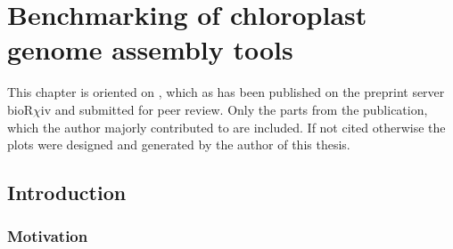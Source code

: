 \newcommand{\formatprogramnames}[1]{\texttt{#1}}
\newcommand{\ce}{\formatprogramnames{chloroExtractor}}
\newcommand{\oa}{\formatprogramnames{ORG.Asm}}
\newcommand{\fp}{\formatprogramnames{Fast-Plast}}
\newcommand{\ioga}{\formatprogramnames{IOGA}}
\newcommand{\np}{\formatprogramnames{NOVOPlasty}}
\newcommand{\go}{\formatprogramnames{GetOrganelle}}
\newcommand{\cassp}{\formatprogramnames{Chloroplast assembly protocol}}



\chapter{Benchmarking of chloroplast genome assembly tools } %

\label{Chapter1} %
This chapter is oriented on \cite{freudenthal2019landscape}, which as
has been published on the preprint server bioR$\chi$iv and submitted
for peer review. Only the parts from the publication, which the
author majorly contributed to are included. If not cited otherwise the
plots were designed and generated by the author of this thesis.


\newcommand{\keyword}[1]{\textbf{#1}}
\newcommand{\tabhead}[1]{\textbf{#1}}
\newcommand{\code}[1]{\texttt{#1}}
\newcommand{\file}[1]{\texttt{\bfseries#1}}
\newcommand{\option}[1]{\texttt{\itshape#1}}


\section{Introduction} \label{intro:cp}
\subsection{Motivation}

